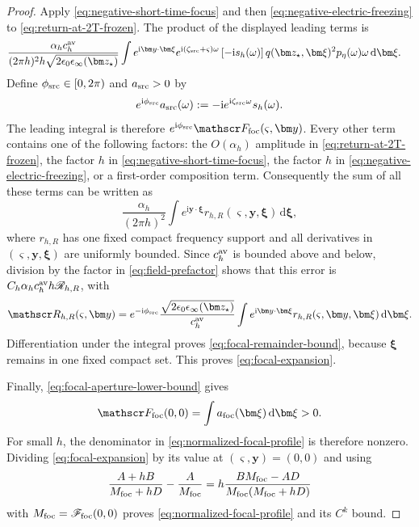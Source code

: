 \documentclass[11pt,reqno]{amsart}
\newcommand{\ii}{\mathrm{i}}
\newcommand{\dd}{\,\mathrm{d}}
\numberwithin{equation}{section}
\begin{document}
\begin{proof}
Apply \eqref{eq:negative-short-time-focus} and then \eqref{eq:negative-electric-freezing} to \eqref{eq:return-at-2T-frozen}. The product of the displayed leading terms is
\begin{equation*}
 \begin{aligned}
 &\frac{\alpha_hc_h^{\rm av}}{(2\pi h)^2h\sqrt{2\epsilon_0\epsilon_\infty(\bm z_\star)}}\int e^{\ii\bm y\cdot\bm\xi}e^{\ii(\zeta_{\rm src}+\varsigma)\omega}
 \left[-\ii s_h(\omega)\right]q(\bm z_\star,\bm\xi)^2p_\eta(\omega)\omega\dd\bm\xi.
 \end{aligned}
\end{equation*}
Define $\phi_{\rm src}\in[0,2\pi)$ and $a_{\rm src}>0$ by
\begin{equation*}
 e^{\ii\phi_{\rm src}}a_{\rm src}(\omega):=-\ii e^{\ii \zeta_{\rm src}\omega}s_h(\omega).
\end{equation*}
The leading integral is therefore $e^{\ii\phi_{\rm src}}\mathscr F_{\rm foc}(\varsigma,\bm y)$. Every other term contains one of the following factors: the $O(\alpha_h)$ amplitude in \eqref{eq:return-at-2T-frozen}, the factor $h$ in \eqref{eq:negative-short-time-focus}, the factor $h$ in \eqref{eq:negative-electric-freezing}, or a first-order composition term. Consequently the sum of all these terms can be written as
\begin{equation*}
 \frac{\alpha_h}{(2\pi h)^2}\int e^{\ii\bm y\cdot\bm\xi}r_{h,R}(\varsigma,\bm y,\bm\xi)\dd\bm\xi,
\end{equation*}
where $r_{h,R}$ has one fixed compact frequency support and all derivatives in $(\varsigma,\bm y,\bm\xi)$ are uniformly bounded. Since $c_h^{\rm av}$ is bounded above and below, division by the factor in \eqref{eq:field-prefactor} shows that this error is $C_h\alpha_hc_h^{\rm av}h\mathscr R_{h,R}$, with
\begin{equation*}
 \mathscr R_{h,R}(\varsigma,\bm y)=e^{-\ii\phi_{\rm src}}\frac{\sqrt{2\epsilon_0\epsilon_\infty(\bm z_\star)}}{c_h^{\rm av}}\int e^{\ii\bm y\cdot\bm\xi}r_{h,R}(\varsigma,\bm y,\bm\xi)\dd\bm\xi.
\end{equation*}
Differentiation under the integral proves \eqref{eq:focal-remainder-bound}, because $\bm\xi$ remains in one fixed compact set. This proves \eqref{eq:focal-expansion}.

Finally, \eqref{eq:focal-aperture-lower-bound} gives
\begin{equation*}
 \mathscr F_{\rm foc}(0,0)=\int a_{\rm foc}(\bm\xi)\dd\bm\xi>0.
\end{equation*}
For small $h$, the denominator in \eqref{eq:normalized-focal-profile} is therefore nonzero. Dividing \eqref{eq:focal-expansion} by its value at $(\varsigma,\bm y)=(0,0)$ and using
\begin{equation*}
 \frac{A+hB}{M_{\rm foc}+hD}-\frac A{M_{\rm foc}}=h\frac{BM_{\rm foc}-AD}{M_{\rm foc}(M_{\rm foc}+hD)}
\end{equation*}
with $M_{\rm foc}=\mathscr F_{\rm foc}(0,0)$ proves \eqref{eq:normalized-focal-profile} and its $C^k$ bound.
\end{proof}
\end{document}
